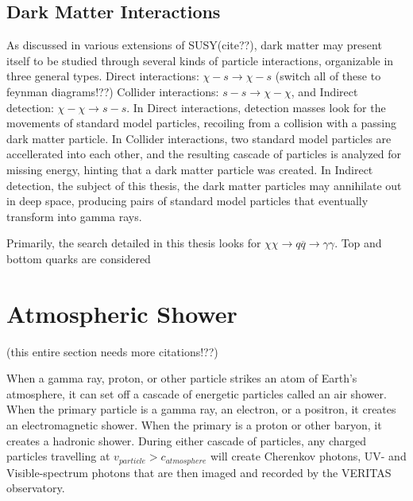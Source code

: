 \subsection{Dark Matter Interactions}
As discussed in various extensions of SUSY(cite??), dark matter may present itself to be studied through several kinds of particle interactions, organizable in three general types.
Direct interactions: $\chi-s \rightarrow \chi-s$ (switch all of these to feynman diagrams!??) Collider interactions: $s-s \rightarrow \chi-\chi$, and Indirect detection: $\chi-\chi \rightarrow s-s$.
In Direct interactions, detection masses look for the movements of standard model particles, recoiling from a collision with a passing dark matter particle.
In Collider interactions, two standard model particles are accellerated into each other, and the resulting cascade of particles is analyzed for missing energy, hinting that a dark matter particle was created.
In Indirect detection, the subject of this thesis, the dark matter particles may annihilate out in deep space, producing pairs of standard model particles that eventually transform into gamma rays.

Primarily, the search detailed in this thesis looks for $\chi\chi \rightarrow q\overline{q} \rightarrow \gamma\gamma$.
Top and bottom quarks are considered





\section{Atmospheric Shower}
(this entire section needs more citations!??)

When a gamma ray, proton, or other particle strikes an atom of Earth's atmosphere, it can set off a cascade of energetic particles called an air shower.
When the primary particle is a gamma ray, an electron, or a positron, it creates an electromagnetic shower.
When the primary is a proton or other baryon, it creates a hadronic shower.
During either cascade of particles, any charged particles travelling at $v_{particle} > c_{atmosphere}$ will create Cherenkov photons, UV- and Visible-spectrum photons that are then imaged and recorded by the VERITAS observatory.

